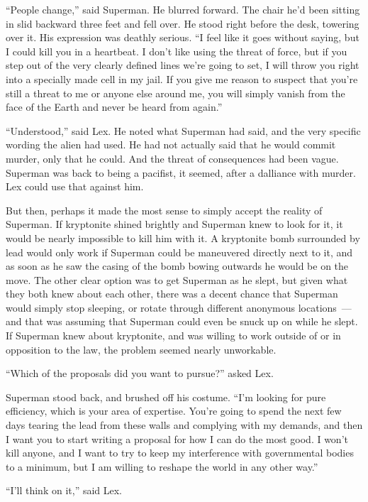 \documentclass[ebook,12pt]{memoir}
\begin{document}
``People change,'' said Superman. He blurred forward. The chair he'd
been sitting in slid backward three feet and fell over. He stood right
before the desk, towering over it. His expression was deathly serious.
``I feel like it goes without saying, but I could kill you in a
heartbeat. I don't like using the threat of force, but if you step out
of the very clearly defined lines we're going to set, I will throw you
right into a specially made cell in my jail. If you give me reason to
suspect that you're still a threat to me or anyone else around me, you
will simply vanish from the face of the Earth and never be heard from
again.''

``Understood,'' said Lex. He noted what Superman had said, and the very
specific wording the alien had used. He had not actually said that he
would commit murder, only that he could. And the threat of consequences
had been vague. Superman was back to being a pacifist, it seemed, after
a dalliance with murder. Lex could use that against him.

But then, perhaps it made the most sense to simply accept the reality of
Superman. If kryptonite shined brightly and Superman knew to look for
it, it would be nearly impossible to kill him with it. A kryptonite bomb
surrounded by lead would only work if Superman could be maneuvered
directly next to it, and as soon as he saw the casing of the bomb bowing
outwards he would be on the move. The other clear option was to get
Superman as he slept, but given what they both knew about each other,
there was a decent chance that Superman would simply stop sleeping, or
rotate through different anonymous locations~--- and that was assuming
that Superman could even be snuck up on while he slept. If Superman knew
about kryptonite, and was willing to work outside of or in opposition to
the law, the problem seemed nearly unworkable.

``Which of the proposals did you want to pursue?'' asked Lex.

Superman stood back, and brushed off his costume. ``I'm looking for pure
efficiency, which is your area of expertise. You're going to spend the
next few days tearing the lead from these walls and complying with my
demands, and then I want you to start writing a proposal for how I can
do the most good. I won't kill anyone, and I want to try to keep my
interference with governmental bodies to a minimum, but I am willing to
reshape the world in any other way.''

``I'll think on it,'' said Lex.
\end{document}
